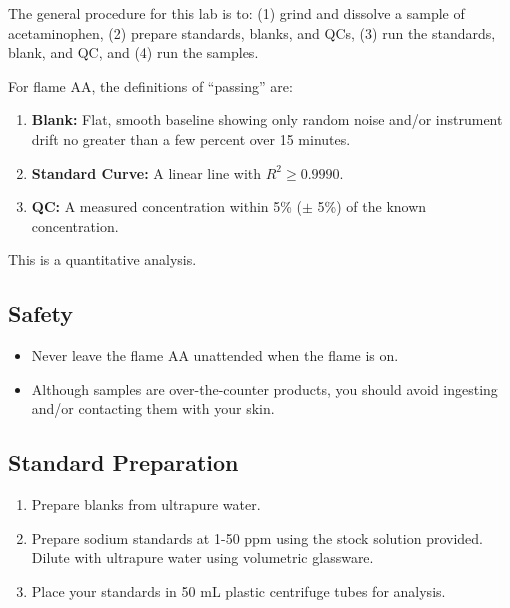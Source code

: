 \documentclass[]{tufte-book}
\providecommand{\tightlist}{%
  \setlength{\itemsep}{0pt}\setlength{\parskip}{0pt}}
\begin{document}
The general procedure for this lab is to: (1) grind and dissolve a sample of acetaminophen, (2) prepare standards, blanks, and QCs, (3) run the standards, blank, and QC, and (4) run the samples.

For flame AA, the definitions of ``passing'' are:

\begin{enumerate}
\def\labelenumi{\arabic{enumi}.}
\tightlist
\item
  \textbf{Blank:} Flat, smooth baseline showing only random noise and/or instrument drift no greater than a few percent over 15 minutes.\\
\item
  \textbf{Standard Curve:} A linear line with \(R^2 \ge 0.9990\).\\
\item
  \textbf{QC:} A measured concentration within 5\% (\(\pm\) 5\%) of the known concentration.
\end{enumerate}

This is a quantitative analysis.

\hypertarget{safety-8}{%
\subsection*{Safety}\label{safety-8}}

\begin{itemize}
\tightlist
\item
  Never leave the flame AA unattended when the flame is on.\\
\item
  Although samples are over-the-counter products, you should avoid ingesting and/or contacting them with your skin.
\end{itemize}

\hypertarget{standard-preparation-3}{%
\subsection{Standard Preparation}\label{standard-preparation-3}}

\begin{enumerate}
\def\labelenumi{\arabic{enumi}.}
\tightlist
\item
  Prepare blanks from ultrapure water.
\item
  Prepare sodium standards at 1-50 ppm using the stock solution provided. Dilute with ultrapure water using volumetric glassware.
\item
  Place your standards in 50 mL plastic centrifuge tubes for analysis.
\end{enumerate}
\end{document}
